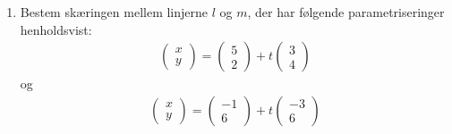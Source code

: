 \begin{enumerate}[label=\roman*)]
\item Bestem skæringen mellem linjerne $l$ og $m$, der har følgende parametriseringer henholdsvist:
\begin{align*}
\begin{pmatrix}
x \\ y
\end{pmatrix}
= 
\begin{pmatrix}
5 \\ 2
\end{pmatrix}
+
t
\begin{pmatrix}
3 \\ 4
\end{pmatrix}
\end{align*}
og 
\begin{align*}
\begin{pmatrix}
x \\ y
\end{pmatrix}
= 
\begin{pmatrix}
-1 \\ 6
\end{pmatrix}
+
t
\begin{pmatrix}
-3 \\ 6
\end{pmatrix}
\end{align*}

\end{enumerate}